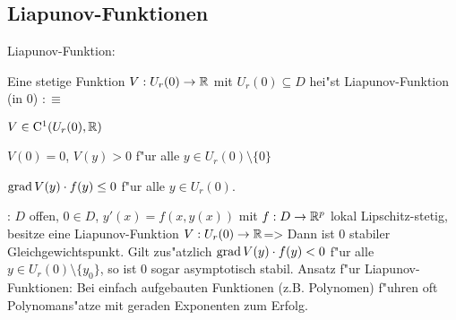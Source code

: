 \subsection{Liapunov-Funktionen}
 Liapunov-Funktion:{
  Eine stetige Funktion $V:U_r(0)\to\mathbb R$ mit $U_r(0)\subseteq D$ hei"st 
  Liapunov-Funktion (in $0$) $:\equiv$
  \begin{stmts}
    \item $V\in{\rm C}^1(U_r(0),\mathbb R)$
    \item $V(0)=0$, $V(y)>0$ f"ur alle $y\in U_r(0)\setminus\{0\}$
    \item $\operatorname{grad} V(y)\cdot f(y)\leq 0$ f"ur alle $y\in U_r(0)$.
    \end{stmts}
  }
\theorem: $D$ offen, $0\in D$,
  $y'(x)=f(x,y(x))$ mit $f:D\to\mathbb R^p$ lokal Lipschitz-stetig,
  besitze eine Liapunov-Funktion $V:U_r(0)\to\mathbb R$=>{
  Dann ist $0$ stabiler Gleichgewichtspunkt. Gilt zus"atzlich
  $\operatorname{grad} V(y)\cdot f(y)<0$ f"ur alle $y\in U_r(0)\setminus\{y_0\}$, so
  ist $0$ sogar asymptotisch stabil.
  }
\trick Ansatz f"ur Liapunov-Funktionen:{
  Bei einfach aufgebauten Funktionen (z.B. Polynomen) f"uhren oft
  Polynomans"atze mit geraden Exponenten zum Erfolg.
  }
